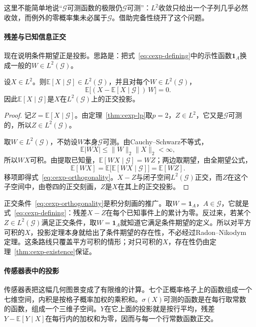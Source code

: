 这里不能简单地说“$\mathcal{G}$可测函数的极限仍$\mathcal{G}$可测”：$L^{2}$收敛只给出一个子列几乎必然收敛，而例外的零概率集未必属于$\mathcal{G}$。借助完备性绕开了这个问题。

\paragraph{残差与已知信息正交}
现在说明条件期望正是投影。思路是：把式~\eqref{eq:cexp-defining}中的示性函数$\mathbf{1}_{A}$换成一般的$W\in L^{2}(\mathcal{G})$。

\begin{theorem}[条件期望是正交投影]
\label{thm:cexp-projection}
设$X\in L^{2}$。则$\mathbb{E}[X\mid\mathcal{G}]\in L^{2}(\mathcal{G})$，并且对每个$W\in L^{2}(\mathcal{G})$，
\begin{equation}
 \mathbb{E}\bigl[(X-\mathbb{E}[X\mid\mathcal{G}])\,W\bigr]=0 .
 \label{eq:cexp-orthogonality}
\end{equation}
因此$\mathbb{E}[X\mid\mathcal{G}]$是$X$在$L^{2}(\mathcal{G})$上的正交投影。
\end{theorem}

\begin{proof}
记$Z=\mathbb{E}[X\mid\mathcal{G}]$。由定理~\ref{thm:cexp-lp}取$p=2$，$Z\in L^{2}$，它又是$\mathcal{G}$可测的，所以$Z\in L^{2}(\mathcal{G})$。

取$W\in L^{2}(\mathcal{G})$，不妨设$W$本身$\mathcal{G}$可测。由Cauchy--Schwarz不等式，
\[
 \mathbb{E}\lvert WX\rvert\leq\lVert W\rVert_2\lVert X\rVert_2<\infty ,
\]
所以$WX$可积。由提取已知量，$\mathbb{E}[WX\mid\mathcal{G}]=WZ$；两边取期望，由全期望公式，
\[
 \mathbb{E}[WX]=\mathbb{E}\bigl[\mathbb{E}[WX\mid\mathcal{G}]\bigr]=\mathbb{E}[WZ] .
\]
移项即得式~\eqref{eq:cexp-orthogonality}。$X-Z$与闭子空间$L^{2}(\mathcal{G})$正交，而$Z$在这个子空间中，由卷四的正交刻画，$Z$是$X$在其上的正交投影。
\end{proof}

正交条件~\eqref{eq:cexp-orthogonality}是积分刻画的推广。取$W=\mathbf{1}_{A}$，$A\in\mathcal{G}$，它就是式~\eqref{eq:cexp-defining}：残差$X-Z$在每个已知事件上的累计为零。反过来，若某个$Z\in L^{2}(\mathcal{G})$满足正交条件，取$W=\mathbf{1}_{A}$就知道它满足条件期望的定义。所以对平方可积的$X$，投影定理本身就给出了条件期望的存在性，不必经过Radon--Nikodym定理。这条路线只覆盖平方可积的情形；对只可积的$X$，存在性仍由定理~\ref{thm:cexp-existence}保证。

\paragraph{传感器表中的投影}
传感器表把这幅几何图景变成了有限维的计算。七个正概率格子上的函数组成一个七维空间，内积是按格子概率加权的乘积和。$\sigma(X)$可测的函数是在每行取常数的函数，组成一个三维子空间。$Y$在它上面的投影就是按行平均，残差$Y-\mathbb{E}[Y\mid X]$在每行内的加权和为零，因而与每一个行常数函数正交。

